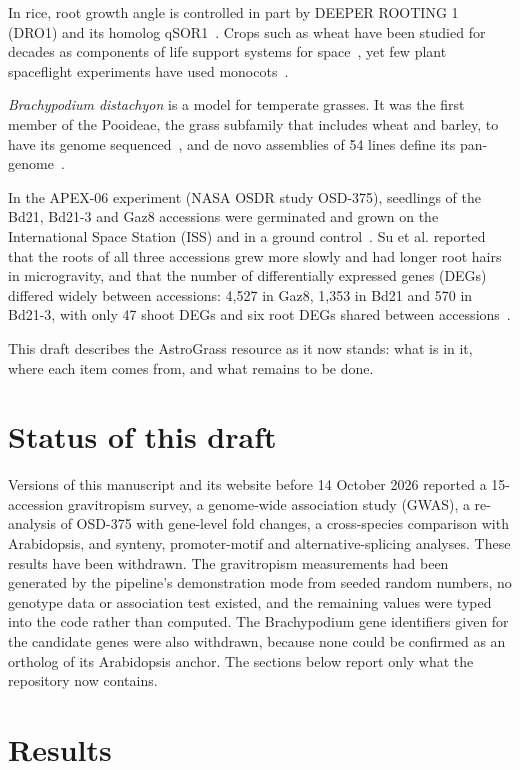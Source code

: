 \documentclass[sn-mathphys-num,Basic]{sn-jnl}
\begin{document}
In rice, root growth angle is controlled in part by DEEPER ROOTING 1 (DRO1) and its homolog qSOR1~\cite{Uga2013,Kitomi2020}. Crops such as wheat have been studied for decades as components of life support systems for space~\cite{Wheeler2017}, yet few plant spaceflight experiments have used monocots~\cite{Su2023}.

\textit{Brachypodium distachyon} is a model for temperate grasses. It was the first member of the Pooideae, the grass subfamily that includes wheat and barley, to have its genome sequenced~\cite{IBI2010}, and de novo assemblies of 54 lines define its pan-genome~\cite{Gordon2017}.

In the APEX-06 experiment (NASA OSDR study OSD-375), seedlings of the Bd21, Bd21-3 and Gaz8 accessions were germinated and grown on the International Space Station (ISS) and in a ground control~\cite{Su2023}. Su et al. reported that the roots of all three accessions grew more slowly and had longer root hairs in microgravity, and that the number of differentially expressed genes (DEGs) differed widely between accessions: 4,527 in Gaz8, 1,353 in Bd21 and 570 in Bd21-3, with only 47 shoot DEGs and six root DEGs shared between accessions~\cite{Su2023}.

This draft describes the AstroGrass resource as it now stands: what is in it, where each item comes from, and what remains to be done.

\section{Status of this draft}

Versions of this manuscript and its website before 14 October 2026 reported a 15-accession gravitropism survey, a genome-wide association study (GWAS), a re-analysis of OSD-375 with gene-level fold changes, a cross-species comparison with Arabidopsis, and synteny, promoter-motif and alternative-splicing analyses. These results have been withdrawn. The gravitropism measurements had been generated by the pipeline's demonstration mode from seeded random numbers, no genotype data or association test existed, and the remaining values were typed into the code rather than computed. The Brachypodium gene identifiers given for the candidate genes were also withdrawn, because none could be confirmed as an ortholog of its Arabidopsis anchor. The sections below report only what the repository now contains.

\section{Results}
\end{document}
